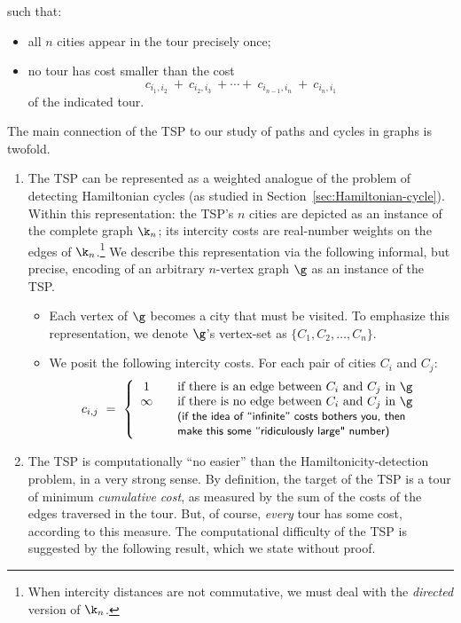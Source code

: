 \noindent such that:
\begin{itemize}
\item
all $n$ cities appear in the tour precisely once;
\item
no tour has cost smaller than the cost
\[ c_{i_1,i_2} \ + \ c_{i_2, i_3} \ + \cdots + \ c_{i_{n-1}, i_n} \ + \ c_{i_n, i_1}
\]
of the indicated tour.
\end{itemize}
The main connection of the TSP to our study of paths and cycles in graphs is twofold.
\begin{enumerate}
\item
The TSP can be represented as a weighted analogue of the problem of detecting Hamiltonian cycles (as studied in Section~\ref{sec:Hamiltonian-cycle}).  Within this representation: the TSP's $n$ cities are depicted as an instance of the complete graph $\k_n$; its intercity costs are real-number weights on the edges of $\k_n$.\footnote{When intercity distances are not commutative, we must deal with the {\em directed} version of $\k_n$.}  We describe this representation via the following informal, but precise, encoding of an arbitrary $n$-vertex graph $\g$ as an instance of the TSP.
  \begin{itemize}
  \item
Each vertex of $\g$ becomes a city that must be visited.  To emphasize this representation, we denote $\g$'s vertex-set as $\{C_1, C_2, \ldots, C_n\}$.
  \item
We posit the following intercity costs.  For each pair of cities $C_i$ and $C_j$:
\[ c_{i,j} \ = \ \left\{
\begin{array}{ccl}
1 & & \mbox{if there is an edge between $C_i$ and $C_j$ in $\g$} \\
\infty & & \mbox{if there is no edge between $C_i$ and $C_j$ in $\g$} \\
       & & \mbox{\small\sf (if the idea of ``infinite'' costs bothers you, then} \\
       & & \mbox{\small\sf make this some ``ridiculously large" number)}
\end{array}
\right.
\]
\end{itemize}

\item
The TSP is computationally ``no easier'' than the Hamiltonicity-detection problem, in a very strong sense.  By definition, the target of the TSP is a tour of minimum {\em cumulative cost}, as measured by the sum of the costs of the edges traversed in the tour.  But, of course, {\em every} tour has some cost, according to this measure.  The computational difficulty of the TSP is suggested by the following result, which we state without proof.
\end{enumerate}

